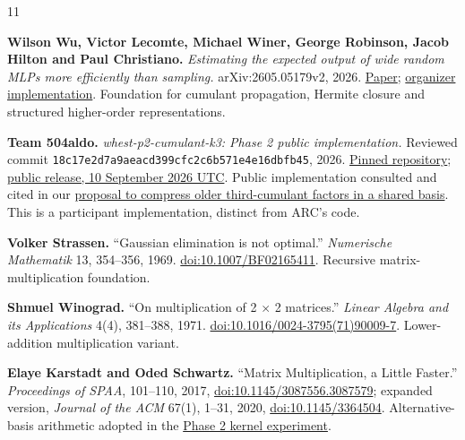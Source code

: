 \documentclass[11pt,letterpaper]{article}
\begin{document}
{}
\begin{thebibliography}{11}
\footnotesize
\raggedright
\setlength{\itemsep}{1pt}
\textbf{Wilson Wu, Victor Lecomte, Michael Winer, George Robinson, Jacob Hilton and Paul Christiano.} \emph{Estimating the expected output of wide random MLPs more efficiently than sampling.} arXiv:2605.05179v2, 2026. \href{https://arxiv.org/abs/2605.05179v2}{Paper}; \href{https://github.com/alignment-research-center/mlp_cumulant_propagation}{organizer implementation}. Foundation for cumulant propagation, Hermite closure and structured higher-order representations.

\textbf{Team 504aldo.} \emph{whest-p2-cumulant-k3: Phase 2 public implementation.} Reviewed commit \texttt{18c17e2d\allowbreak{}7a9aeacd\allowbreak{}399cfc2c\allowbreak{}6b571e4e\allowbreak{}16dbfb45}, 2026. \href{https://github.com/504aldo/whest-p2-cumulant-k3/tree/18c17e2d7a9aeacd399cfc2c6b571e4e16dbfb45}{Pinned repository}; \href{https://discourse.aicrowd.com/t/everything-we-tried-a-factorized-k-3-cumulant-propagation-estimator-at-0-25-x-b-where-its-flops-go-and-25-measured-dead-ends-team-504aldo-rank-10/18218}{public release, 10 September 2026 UTC}. Public implementation consulted and cited in our \href{https://github.com/mattliston/arc-whitebox-estimation-challenge/blob/main/records/research/2026-09-12-shared-rank-384-basis-cubic-cohorts-older-than-four/PROTOCOL.md\#L203}{proposal to compress older third-cumulant factors in a shared basis}. This is a participant implementation, distinct from ARC's code.

\textbf{Volker Strassen.} ``Gaussian elimination is not optimal.'' \emph{Numerische Mathematik} 13, 354--356, 1969. \href{https://doi.org/10.1007/BF02165411}{doi:10.1007/BF02165411}. Recursive matrix-multiplication foundation.

\textbf{Shmuel Winograd.} ``On multiplication of 2 \(\times\) 2 matrices.'' \emph{Linear Algebra and its Applications} 4(4), 381--388, 1971. \href{https://doi.org/10.1016/0024-3795(71)90009-7}{doi:10.1016/0024-3795(71)90009-7}. Lower-addition multiplication variant.

\textbf{Elaye Karstadt and Oded Schwartz.} ``Matrix Multiplication, a Little Faster.'' \emph{Proceedings of SPAA}, 101--110, 2017, \href{https://doi.org/10.1145/3087556.3087579}{doi:10.1145/3087556.3087579}; expanded version, \emph{Journal of the ACM} 67(1), 1--31, 2020, \href{https://doi.org/10.1145/3364504}{doi:10.1145/3364504}. Alternative-basis arithmetic adopted in the \href{https://github.com/mattliston/arc-whitebox-estimation-challenge/tree/main/experiments/arithmetic-kernels/alternative-basis-winograd-reduces-metered-work-1-22-user/}{Phase 2 kernel experiment}.


\end{thebibliography}
\end{document}
